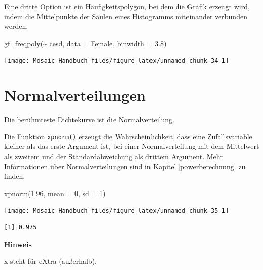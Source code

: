 \documentclass[
  ngerman,
]{scrbook}
\newenvironment{Shaded}{\begin{snugshade}}{\end{snugshade}}
\newcommand{\AttributeTok}[1]{\textcolor[rgb]{0.77,0.63,0.00}{#1}}
\newcommand{\DecValTok}[1]{\textcolor[rgb]{0.00,0.00,0.81}{#1}}
\newcommand{\FloatTok}[1]{\textcolor[rgb]{0.00,0.00,0.81}{#1}}
\newcommand{\FunctionTok}[1]{\textcolor[rgb]{0.00,0.00,0.00}{#1}}
\newcommand{\NormalTok}[1]{#1}
\newcommand{\SpecialCharTok}[1]{\textcolor[rgb]{0.00,0.00,0.00}{#1}}
\newenvironment{hinweis}[1]
  {
  \begin{itemize}
  \renewcommand{\labelitemi}{
    \raisebox{1.8\height}[0pt][0pt]{
      {\setkeys{Gin}{width=7em,keepaspectratio}
        {\Large \textcolor{dark-fom-green}\faHandORight}}
        }
  }
  \begin{blackbox}
        \bgroup\color{dark-fom-green}
          {\textbf{Hinweis}}
        \egroup
  \item
  }
  {
  \end{blackbox}
  \end{itemize}
  }
\begin{document}
Eine dritte Option ist ein Häufigkeitspolygon, bei dem die Grafik erzeugt wird, indem die Mittelpunkte der Säulen eines Histogramms miteinander verbunden werden.

\begin{Shaded}
\begin{Highlighting}[]
\FunctionTok{gf\_freqpoly}\NormalTok{(}\SpecialCharTok{\textasciitilde{}}\NormalTok{ cesd, }\AttributeTok{data =}\NormalTok{ Female, }\AttributeTok{binwidth =} \FloatTok{3.8}\NormalTok{)}
\end{Highlighting}
\end{Shaded}

\begin{center}\texttt{[image: Mosaic-Handbuch\_files/figure-latex/unnamed-chunk-34-1]} \end{center}

\hypertarget{normalverteilungen}{%
\section{Normalverteilungen}\label{normalverteilungen}}

Die berühmteste Dichtekurve ist die Normalverteilung.

Die Funktion \texttt{xpnorm()} erzeugt die Wahrscheinlichkeit, dass eine Zufallsvariable kleiner als das erste Argument ist, bei einer Normalverteilung mit dem Mittelwert als zweitem und der Standardabweichung als drittem Argument. Mehr Informationen über Normalverteilungen sind in Kapitel \ref{powerberechnung} zu finden.

\begin{Shaded}
\begin{Highlighting}[]
\FunctionTok{xpnorm}\NormalTok{(}\FloatTok{1.96}\NormalTok{, }\AttributeTok{mean =} \DecValTok{0}\NormalTok{, }\AttributeTok{sd =} \DecValTok{1}\NormalTok{)}
\end{Highlighting}
\end{Shaded}

\begin{center}\texttt{[image: Mosaic-Handbuch\_files/figure-latex/unnamed-chunk-35-1]} \end{center}

\begin{verbatim}
[1] 0.975
\end{verbatim}

\begin{hinweis}{hinweis}
x steht für eXtra (außerhalb).

\end{hinweis}
\end{document}
